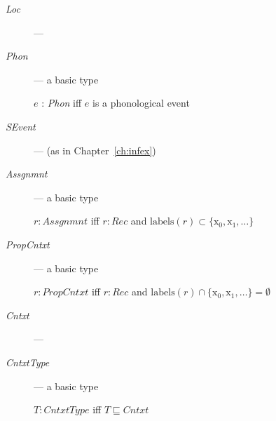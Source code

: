 \begin{description}

  \item[\textnormal{\textit{Loc}}] --- 

  
\item[\textnormal{\textit{Phon}}] --- a basic type

  $e$ : \textit{Phon} iff $e$ is a phonological event
  
\item[\textnormal{\textit{SEvent}}] ---  (as in
      Chapter~\ref{ch:infex})

      \item[\textnormal{\textit{Assgnmnt}}] --- a basic type

      $r:\textit{Assgnmnt}$ iff
$r:\textit{Rec}$ and
$\mathrm{labels}(r)\subset\{\text{x}_0,\text{x}_1,\ldots\}$

\item[\textnormal{\textit{PropCntxt}}] --- a basic type

  $r:\textit{PropCntxt}$ iff
$r:\textit{Rec}$ and
$\mathrm{labels}(r)\cap\{\text{x}_0,\text{x}_1,\ldots\}=\emptyset$

\item[\textnormal{\textit{Cntxt}}] --- 

        \item[\textnormal{\textit{CntxtType}}] --- a basic type

    $T:\textit{CntxtType}$ iff $T\sqsubseteq\textit{Cntxt}$
      


\end{description}
